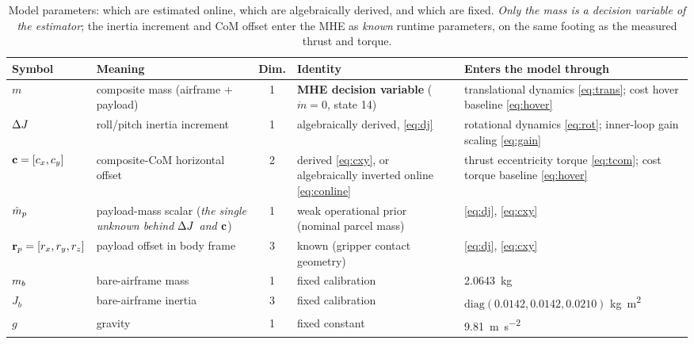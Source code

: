 \documentclass[conference]{IEEEtran}
\begin{document}
\begin{table}[t]
\caption{Model parameters: which are estimated online, which are algebraically
derived, and which are fixed. \emph{Only the mass is a decision variable of the
estimator}; the inertia increment and CoM offset enter the MHE as \emph{known}
runtime parameters, on the same footing as the measured thrust and torque.}
\label{tab:params}
\centering
\footnotesize
\begin{tabular}{@{}l p{} c p{} p{}@{}}
\toprule
Symbol & Meaning & Dim. & Identity & Enters the model through \\
\midrule
$m$ & composite mass (airframe + payload) & 1 & \textbf{MHE decision variable} ($\dot m = 0$, state 14) & translational dynamics \eqref{eq:trans}; cost hover baseline \eqref{eq:hover} \\
$\Delta J$ & roll/pitch inertia increment & 1 & algebraically derived, \eqref{eq:dj} & rotational dynamics \eqref{eq:rot}; inner-loop gain scaling \eqref{eq:gain} \\
$\mathbf{c} = [c_x, c_y]$ & composite-CoM horizontal offset & 2 & derived \eqref{eq:cxy}, or algebraically inverted online \eqref{eq:conline} & thrust eccentricity torque \eqref{eq:tcom}; cost torque baseline \eqref{eq:hover} \\
\midrule
$\hat{m}_p$ & payload-mass scalar (\emph{the single unknown behind $\Delta J$ and $\mathbf{c}$}) & 1 & weak operational prior (nominal parcel mass) & \eqref{eq:dj}, \eqref{eq:cxy} \\
$\mathbf{r}_p = [r_x, r_y, r_z]$ & payload offset in body frame & 3 & known (gripper contact geometry) & \eqref{eq:dj}, \eqref{eq:cxy} \\
\midrule
$m_b$ & bare-airframe mass & 1 & fixed calibration & \SI{2.0643}{\kg} \\
$J_b$ & bare-airframe inertia & 3 & fixed calibration & $\mathrm{diag}(0.0142, 0.0142, 0.0210)$ \si{\kg\meter\squared} \\
$g$ & gravity & 1 & fixed constant & \SI{9.81}{\meter\per\second\squared} \\
\bottomrule
\end{tabular}
\end{table}
\end{document}
